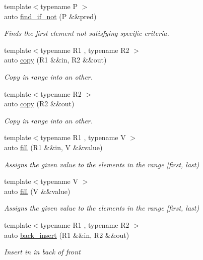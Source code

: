 \begin{DoxyCompactItemize}
{\footnotesize template$<$typename P $>$ }\\auto \mbox{\hyperlink{namespacerah_a406c37a2cf758e7329bfd696a6bf8f89}{find\+\_\+if\+\_\+not}} (P \&\&pred)
\begin{DoxyCompactList}\small\item\em Finds the first element not satisfying specific criteria. \end{DoxyCompactList}\item 
{\footnotesize template$<$typename R1 , typename R2 $>$ }\\auto \mbox{\hyperlink{namespacerah_a1d0f36ff683cedc9090956ea389b3312}{copy}} (R1 \&\&in, R2 \&\&out)
\begin{DoxyCompactList}\small\item\em Copy in range into an other. \end{DoxyCompactList}\item 
{\footnotesize template$<$typename R2 $>$ }\\auto \mbox{\hyperlink{namespacerah_ab3873d79b7f878223f24062ba562eba9}{copy}} (R2 \&\&out)
\begin{DoxyCompactList}\small\item\em Copy in range into an other. \end{DoxyCompactList}\item 
{\footnotesize template$<$typename R1 , typename V $>$ }\\auto \mbox{\hyperlink{namespacerah_ad6edf0b665289e26018fa3457e25cd6c}{fill}} (R1 \&\&in, V \&\&value)
\begin{DoxyCompactList}\small\item\em Assigns the given value to the elements in the range \mbox{[}first, last) \end{DoxyCompactList}\item 
{\footnotesize template$<$typename V $>$ }\\auto \mbox{\hyperlink{namespacerah_a4dc470cd5701a27ad3388c1b1d07d705}{fill}} (V \&\&value)
\begin{DoxyCompactList}\small\item\em Assigns the given value to the elements in the range \mbox{[}first, last) \end{DoxyCompactList}\item 
{\footnotesize template$<$typename R1 , typename R2 $>$ }\\auto \mbox{\hyperlink{namespacerah_a2734b7f57efb773c6df8ac55b9d040cd}{back\+\_\+insert}} (R1 \&\&in, R2 \&\&out)
\begin{DoxyCompactList}\small\item\em Insert {\itshape in} in back of {\itshape front} \end{DoxyCompactList}\item 

\end{DoxyCompactItemize}
